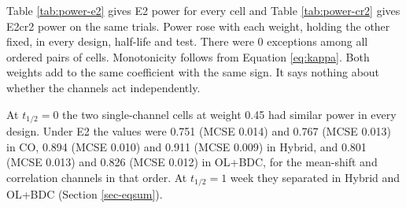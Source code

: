 \documentclass[
  11pt,
]{article}
\begin{document}
Table \ref{tab:power-e2} gives E2 power for every cell and Table
\ref{tab:power-cr2} gives E2cr2 power on the same trials. Power rose
with each weight, holding the other fixed, in every design, half-life
and test. There were 0 exceptions among all ordered
pairs of cells. Monotonicity follows from Equation
\eqref{eq:kappa}. Both weights add to the same coefficient with the
same sign. It says nothing about whether the channels act
independently.

At \(t_{1/2} = 0\) the two single-channel cells at weight 0.45 had
similar power in every design. Under E2 the values were
0.751 (MCSE 0.014) and 0.767 (MCSE 0.013) in CO,
0.894 (MCSE 0.010) and 0.911 (MCSE 0.009) in
Hybrid, and 0.801 (MCSE 0.013) and 0.826 (MCSE 0.012)
in OL+BDC, for the mean-shift and correlation channels in that order.
At \(t_{1/2} = 1\) week they separated in Hybrid and OL+BDC (Section
\ref{sec-eqsum}).
\end{document}

